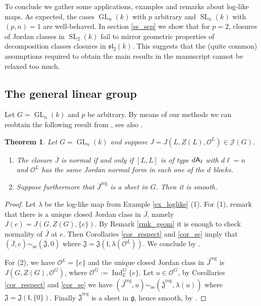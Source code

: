 \documentclass[12pt]{amsart}
\newtheorem{Theorem}{Theorem}[section]
\theoremstyle{definition}
\theoremstyle{remark}
\newcommand{\g}{\mathfrak{g}}
\renewcommand{\l}{\mathfrak{l}}
\renewcommand{\sl}{\mathfrak{sl}}
\newcommand{\J}{\mathfrak{J}}
\renewcommand{\O}{\mathcal{O}}
\newcommand{\reg}{{\operatorname{reg}}}
\newcommand{\Ind}{\operatorname{Ind}}
\newcommand{\GL}{\operatorname{GL}}
\newcommand{\SL}{\operatorname{SL}}
\newcommand{\se}{\operatorname{se}}
\begin{document}
To conclude we gather some applications, examples and remarks about log-like maps. 
As expected, the cases $\GL_n(k)$ with $p$ arbitrary and $\SL_n(k)$ with $(p,n) = 1$ are well-behaved. 
In section \ref{ss_sep} we show that for $p = 2$, closures of Jordan classes in $\SL_2(k)$  fail to mirror geometric properties of decomposition classes closures in $\sl_2(k)$. 
This suggests that the (quite common) assumptions required to obtain the main results in the manuscript cannot be relaxed too much.

\subsection{The general linear group} \label{sub_GLn}
Let $G = \GL_n(k)$ and $p$ be arbitrary. 
By means of our methods we can reobtain the following result from \cite[3.3]{LusztigCCRG}, see also \cite{BroerDecoVar, Peterson}.

\begin{Theorem} \label{thm_GLn}
Let $G = \GL_n(k)$ and suppose  $J = J(L, Z(L), \O^L) \in \mathcal{J}(G)$.
\begin{enumerate}
\item The closure $\overline{J}$ is normal if and only if $[L,L]$ is of type $d \sf{A}_\ell$ with $d \ell = n$ and $\O^L$ has the same Jordan normal form in each one of the $d$ blocks.
\item Suppose furthermore that $\overline{J}^\reg$ is a sheet in $G$. Then it is smooth.
\end{enumerate}
\end{Theorem}

\begin{proof}
Let $\lambda$ be the log-like map  from Example \ref{ex_loglike} (1).
For (1), remark that there is a unique closed Jordan class in $\overline{J}$, namely $J(e) = J(G, Z(G), \{e\})$. By Remark \ref{rmk_geom} it is enough to check normality of $\overline{J}$ at $e$.
Then Corollaries \ref{cor_respect} and \ref{cor_se} imply that $(\overline{J}, e) \sim_{\se} (\overline{\J}, 0)$ where $\J = \J(\l, \lambda(\O^L))$. We conclude by \cite[Proposition 9.2]{BroerDecoVar}.

For (2), we have $\O^L = \{e\}$ and the unique closed Jordan class in $\overline{J}^\reg$ is $J(G, Z(G), \O^G)$, where $\O^G := \Ind_L^G \{e\}$. Let $u \in \O^G$,
by Corollaries \ref{cor_respect} and \ref{cor_se}  we have $(\overline{J}^\reg, u) \sim_{\se} (\overline{\J}^\reg, \lambda(u))$ where $\J = \J(\l, \{ 0 \})$.
 Finally $\overline{\J}^\reg$ is a sheet in $\g$, hence smooth, by \cite[Proposition 9.2]{BroerDecoVar}.
\end{proof}
\end{document}
